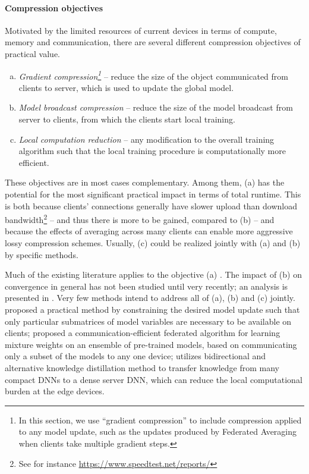 \documentclass[11pt]{article}
\begin{document}
\paragraph{Compression objectives} Motivated by the limited resources of current devices in terms of compute, memory and communication, there are several different compression objectives of practical value.
\begin{enumerate}[(a)]
    \item \emph{Gradient compression\footnote{In this section, we use ``gradient compression'' to include compression applied to any model update, such as the updates produced by Federated Averaging when clients take multiple gradient steps.}} -- reduce the size of the object communicated from clients to server, which is used to update the global model.
    \item \emph{Model broadcast compression} -- reduce the size of the model broadcast from server to clients, from which the clients start local training.
    \item \emph{Local computation reduction} -- any modification to the overall training algorithm such that the local training procedure is computationally more efficient.
\end{enumerate}
These objectives are in most cases complementary. Among them, (a) has the potential for the most significant practical impact in terms of total runtime. This is both because clients' connections generally have slower upload than download bandwidth\footnote{See for instance \url{https://www.speedtest.net/reports/}} -- and thus there is more to be gained, compared to (b) -- and because the effects of averaging across many clients can enable more aggressive lossy compression schemes. Usually, (c) could be realized jointly with (a) and (b) by specific methods. 

Much of the existing literature applies to the objective (a) \citep{konevcny2016federated, suresh2017distributed, konevcny2018randomized, alistarh2017qsgd, horvath2019natural, basu2020qsparse}. The impact of (b) on convergence in general has not been studied until very recently; an analysis is presented in \citep{chraibi2019distributed}. Very few methods intend to address all of (a), (b) and (c) jointly. \citet{caldas2018expanding} proposed a practical method by constraining the desired model update such that only particular submatrices of model variables are necessary to be available on clients; \citet{hamer2020fedboost} proposed a communication-efficient federated algorithm for learning mixture weights on an ensemble of pre-trained models, based on communicating only a subset of the models to any one device; \citet{FedGKT2020} utilizes bidirectional and alternative knowledge distillation method to transfer knowledge from many compact DNNs to a dense server DNN, which can reduce the local computational burden at the edge devices.
\end{document}
